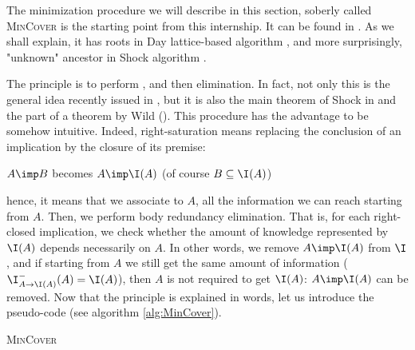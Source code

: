 The minimization procedure we will describe in this section, soberly called
\textsc{MinCover} is the starting point from this internship. It can be found
in \cite{b._ganter_conceptual_2016}. As we shall explain, it has roots in
Day lattice-based algorithm \cite{day_lattice_1992}, and more surprisingly, 
"unknown" ancestor in Shock algorithm \cite{shock_computing_1986}. 

\vspace{1.2em}

The principle is to perform , and then  elimination. In fact, not only this is the general idea 
	recently 
issued in \cite{boros_strong_2017}, but it is also the main theorem of Shock in 
\cite{shock_computing_1986} and the part of a theorem by Wild 
(\cite{wild_implicational_1989, wild_theory_1994}). This procedure has the 
advantage to be somehow intuitive. Indeed, right-saturation means replacing the 
conclusion of an implication by the closure of its premise:

\begin{center} $A \imp B$ becomes $A \imp \I(A)$ (of course $B \subseteq 
	\I(A)$)
\end{center}

\noindent hence, it means that we associate to $A$, all the information we can 
reach starting from $A$. Then, we perform body redundancy elimination. That is, 
for each right-closed implication, we check whether the amount of knowledge 
represented by $\I(A)$ depends necessarily on $A$. In other words, we remove
$A \imp \I(A)$ from $\I$, and if starting from $A$ we still get the same amount 
of information ($\I^{-}_{A \rightarrow \I(A)}(A) = \I(A)$), then
$A$ is not required to get $\I(A)$: $A \imp \I(A)$ can be removed. Now that 
the principle is explained in words, let us introduce the pseudo-code (see 
algorithm \ref{alg:MinCover}).

\vspace{1.2em}

\begin{algorithm}
	
	\BlankLine
	\BlankLine
	
	
	\BlankLine
	
	
	\caption{\textsc{MinCover}}
	\label{alg:MinCover}	
\end{algorithm}

